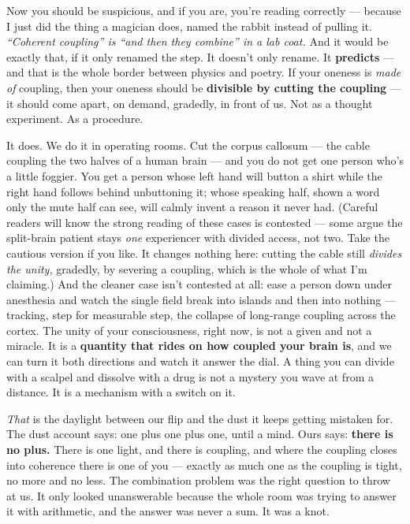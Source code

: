 \documentclass[11pt,openany]{book}
\begin{document}
Now you should be suspicious, and if you are, you’re reading correctly — because I just did the thing a magician does, named the rabbit instead of pulling it. \textit{“Coherent coupling” is “and then they combine” in a lab coat.} And it would be exactly that, if it only renamed the step. It doesn’t only rename. It \textbf{predicts} — and that is the whole border between physics and poetry. If your oneness is \textit{made of} coupling, then your oneness should be \textbf{divisible by cutting the coupling} — it should come apart, on demand, gradedly, in front of us. Not as a thought experiment. As a procedure.

It does. We do it in operating rooms. Cut the corpus callosum — the cable coupling the two halves of a human brain — and you do not get one person who’s a little foggier. You get a person whose left hand will button a shirt while the right hand follows behind unbuttoning it; whose speaking half, shown a word only the mute half can see, will calmly invent a reason it never had. (Careful readers will know the strong reading of these cases is contested — some argue the split-brain patient stays \textit{one} experiencer with divided access, not two. Take the cautious version if you like. It changes nothing here: cutting the cable still \textit{divides the unity,} gradedly, by severing a coupling, which is the whole of what I’m claiming.) And the cleaner case isn’t contested at all: ease a person down under anesthesia and watch the single field break into islands and then into nothing — tracking, step for measurable step, the collapse of long-range coupling across the cortex. The unity of your consciousness, right now, is not a given and not a miracle. It is a \textbf{quantity that rides on how coupled your brain is}, and we can turn it both directions and watch it answer the dial. A thing you can divide with a scalpel and dissolve with a drug is not a mystery you wave at from a distance. It is a mechanism with a switch on it.

\textit{That} is the daylight between our flip and the dust it keeps getting mistaken for. The dust account says: one plus one plus one, until a mind. Ours says: \textbf{there is no plus.} There is one light, and there is coupling, and where the coupling closes into coherence there is one of you — exactly as much one as the coupling is tight, no more and no less. The combination problem was the right question to throw at us. It only looked unanswerable because the whole room was trying to answer it with arithmetic, and the answer was never a sum. It was a knot.
\end{document}
